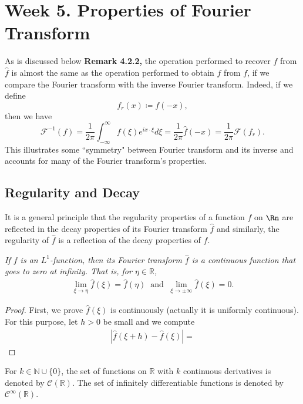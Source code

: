\section{Week 5. Properties of Fourier Transform}
As is discussed below \textbf{Remark 4.2.2,} the operation performed to recover $f$ from $\hat{f}$ is almost the same as the operation performed to obtain $\hat{f}$ from $f$, if we compare the Fourier transform with the inverse Fourier transform. 
Indeed, if we define
\[
f_r(x) \coloneqq f(-x),
\]
then we have
\[
\mathcal{F}^{-1}(f) = \frac{1}{2\pi} \int_{-\infty}^\infty {f}(\xi) e^{i x \cdot \xi} d \xi
 = \frac{1}{2\pi} \hat{f}(-x) = \frac{1}{2\pi} \mathcal{F}(f_r).
\]
This illustrates some ``symmetry" between Fourier transform and its inverse and accounts for many of the Fourier transform's properties. 

\subsection{Regularity and Decay}

It is a general principle that the regularity properties of a function $f$ on $\Rn$ are reflected in the decay properties of its Fourier transform $\hat{f}$ and similarly, the regularity of $\hat{f}$ is a reflection of the decay properties of $f$.

\begin{Theorem}
    \textit{If $f$ is an $L^1$-function, then its Fourier transform $\hat{f}$ is a continuous function that goes to zero at infinity. That is, for $\eta\in\mathbb R$, \begin{align*} \lim_{\xi\to \eta} \hat{f}(\xi)=\hat{f}(\eta) ~\text{ and }~ \lim_{\xi\to\pm\infty} \hat{f}(\xi)=0.\end{align*}}
\end{Theorem}

\begin{proof}
First, we prove $\hat{f}(\xi)$ is continuously (actually it is uniformly continuous). 
For this purpose, let $h> 0$ be small and we compute
\begin{align*}
    |\hat{f}(\xi + h) - \hat{f}(\xi)| = 
\end{align*}
\end{proof}

\begin{Definition}[Definition 4.2.2.]
For $k\in\mathbb N\cup\{0\}$, the set of functions on $\mathbb R$ with $k$ continuous derivatives is denoted by $\mathscr C(\mathbb R)$. The set of infinitely differentiable functions is denoted by $\mathscr C^{\infty}(\mathbb R)$.
    
\end{Definition}

